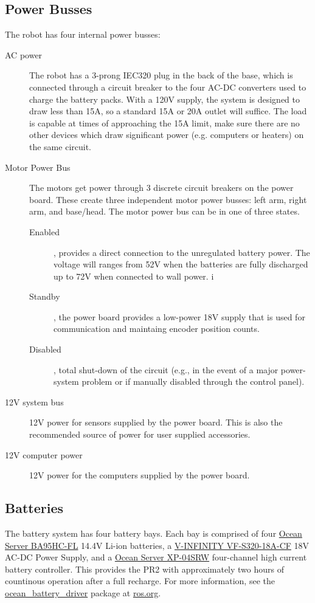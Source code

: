 \subsection{Power Busses}
The robot has four internal power busses:
\begin{description}
\item[AC power] The robot has a 3-prong IEC320 plug in the back of the base, which
  is connected through a circuit breaker to the four AC-DC converters used to
  charge the battery packs.  With a 120V supply, the system is designed to draw less than 15A, so a
  standard 15A or 20A outlet will suffice. The load is capable at times of
  approaching the 15A limit, make sure there are no other devices which draw
  significant power (e.g. computers or heaters) on the same circuit.
\item[Motor Power Bus] The motors get power through 3 discrete circuit breakers
  on the power board.  These create three independent motor power busses: left
  arm, right arm, and base/head.  The motor power bus can be in one of three
  states.
\begin{description}
\item[Enabled], provides a direct connection to the unregulated
  battery power. The voltage will ranges from 52V when the batteries are fully
  discharged up to 72V when connected to wall power.  i
\item[Standby], the power
  board provides a low-power 18V supply that is used for communication and
  maintaing encoder position counts.
\item[Disabled], total shut-down of the
  circuit (e.g., in the event of a major power-system problem or if manually
  disabled through the control panel).
\end{description}
\item[12V system bus] 12V power for sensors supplied by the power board. This is
  also the recommended source of power for user supplied accessories.
\item[12V computer power] 12V power for the computers supplied by the power
  board.
\end{description}
\subsection{Batteries}
The battery system has four battery bays.  Each bay is comprised of four
\href{http://www.oceanserver-store.com/18.html}{Ocean Server BA95HC-FL} 14.4V
Li-ion batteries, a
\href{http://www.v-infinity.com/adtemplate_child.asp?c=710918&p=903285&catky=764537&subcatky1=46887&subcatky2=320934}{V-INFINITY
  VF-S320-18A-CF} 18V AC-DC Power Supply, and a
\href{http://www.oceanserver-store.com/xpmibamamo.html}{Ocean Server XP-04SRW}
four-channel high current battery controller. This provides the PR2 with
approximately two hours of countinous operation after a full recharge.  For more
information, see the \href{http://www.ros.org/wiki/ocean\_battery\_driver}{ocean\_battery\_driver}
package at \href{http://www.ros.org}{ros.org}.

